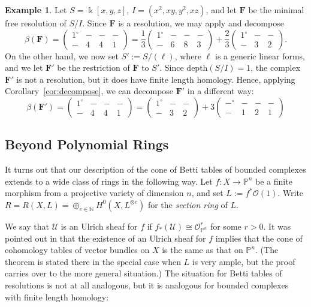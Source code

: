 \documentclass[12pt]{amsart}
\theoremstyle{definition}
\newtheorem{example}[lemma]{Example}
\theoremstyle{remark}
\newcommand{\kk}{\Bbbk}
\newcommand{\PP}{\mathbb{P}}
\newcommand{\cO}{\mathcal{O}}
\newcommand{\cU}{\mathcal{U}}
\newcommand{\FF}{\mathbf{F}}
\newcommand{\defi}[1]{\textsf{#1}} %
\newcommand{\zp}{\circ}
\begin{document}
\begin{example}
Let $S=\kk[x,y,z]$, $I=(x^2,xy,y^2,xz)$, and let $\FF$ be the minimal free resolution of $S/I$.  Since $\FF$ is a resolution, we may apply \cite[Theorem~]{boij-sod2} and decompose
\[
\beta(\FF)=\begin{pmatrix}
1^\zp&-&-&-\\
-&4&4&1
\end{pmatrix}
=
\frac{1}{3}
\begin{pmatrix}
1^\zp&-&-&-\\
-&6&8&3
\end{pmatrix}
+\frac{2}{3}
\begin{pmatrix}
1^\zp&-&-\\
-&3&2
\end{pmatrix}.
\]
On the other hand, we now set $S':=S/(\ell)$, where $\ell$ is a generic linear forms, and we let $\FF'$ be the restriction of $\FF$ to $S'$.  Since $\text{depth}(S/I)=1$, the complex $\FF'$ is not a resolution, but it does have finite length homology.  Hence, applying Corollary~\ref{cor:decompose}, we can decompose $\FF'$ in a different way:
\[
\beta(\FF')=
\begin{pmatrix}
1^\zp&-&-&-\\
-&4&4&1
\end{pmatrix}
=\begin{pmatrix}1^\zp&-&-\\-&3&2\end{pmatrix}
+
3\begin{pmatrix}
-^\zp&-&-&-\\
-&1&2&1
\end{pmatrix}
\] 
\end{example}

\subsection*{Beyond Polynomial Rings}
It turns out that our description of the cone of Betti tables of bounded complexes
extends to a wide class of rings in the following way. Let $f:X\to \PP^{n}$ be a finite
morphism from a projective variety of dimension $n$, and set $L:=f^*\cO(1)$. 
Write $R=R(X,L)=\oplus_{e\in \mathbb N} H^0(X,L^{\otimes e})$ for the \emph{section ring}
of $L$.

We say that $\cU$ is an \defi{Ulrich sheaf} for $f$ if $f_*(\cU)\cong \cO_{\PP^n}^r$ for some $r>0$.  It was pointed out in \cite[Theorem~5]{eis-schrey-abel} that the existence of an Ulrich sheaf for $f$ implies that  the cone of cohomology tables of vector bundles on $X$ is the same as that on $\PP^{n}$. (The theorem is stated there in the special case when $L$ is very ample, but the proof
carries over to the more general situation.) The situation for Betti tables of resolutions is not at all analogous, but it is analogous for bounded complexes with finite length homology:
\end{document}

